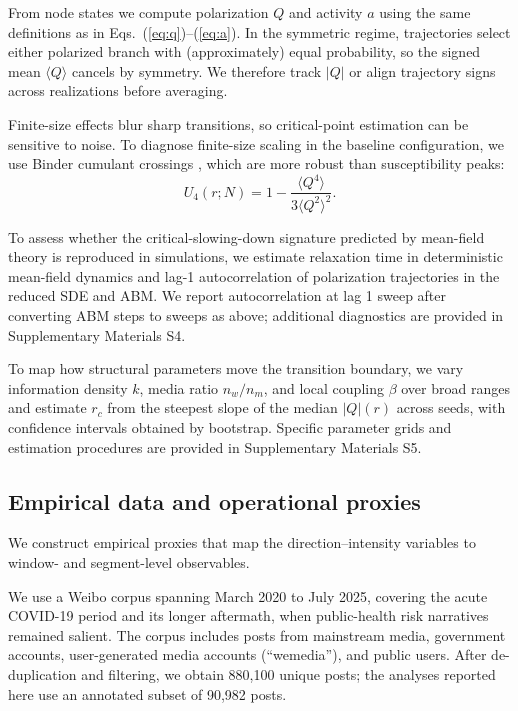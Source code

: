 \documentclass[11pt]{article}
\begin{document}
From node states we compute polarization $Q$ and activity $a$ using the same definitions as in Eqs.~(\ref{eq:q})--(\ref{eq:a}). In the symmetric regime, trajectories select either polarized branch with (approximately) equal probability, so the signed mean $\langle Q\rangle$ cancels by symmetry. We therefore track $|Q|$ or align trajectory signs across realizations before averaging.

Finite-size effects blur sharp transitions, so critical-point estimation can be sensitive to noise. To diagnose finite-size scaling in the baseline configuration, we use Binder cumulant crossings \citep{Binder1981,NewmanBarkema1999}, which are more robust than susceptibility peaks:
\begin{equation}
U_4(r;N)=1-\frac{\langle Q^4\rangle}{3\langle Q^2\rangle^2}.
\label{eq:binder}
\end{equation}

To assess whether the critical-slowing-down signature predicted by mean-field theory is reproduced in simulations, we estimate relaxation time in deterministic mean-field dynamics and lag-1 autocorrelation of polarization trajectories in the reduced SDE and ABM. We report autocorrelation at lag 1 sweep after converting ABM steps to sweeps as above; additional diagnostics are provided in Supplementary Materials S4.

To map how structural parameters move the transition boundary, we vary information density $k$, media ratio $n_w/n_m$, and local coupling $\beta$ over broad ranges and estimate $r_c$ from the steepest slope of the median $|Q|(r)$ across seeds, with confidence intervals obtained by bootstrap. Specific parameter grids and estimation procedures are provided in Supplementary Materials S5.

\subsection{Empirical data and operational proxies}
We construct empirical proxies that map the direction--intensity variables to window- and segment-level observables.

We use a Weibo corpus spanning March 2020 to July 2025, covering the acute COVID-19 period and its longer aftermath, when public-health risk narratives remained salient. The corpus includes posts from mainstream media, government accounts, user-generated media accounts (``wemedia''), and public users. After de-duplication and filtering, we obtain 880,100 unique posts; the analyses reported here use an annotated subset of 90,982 posts.
\end{document}
